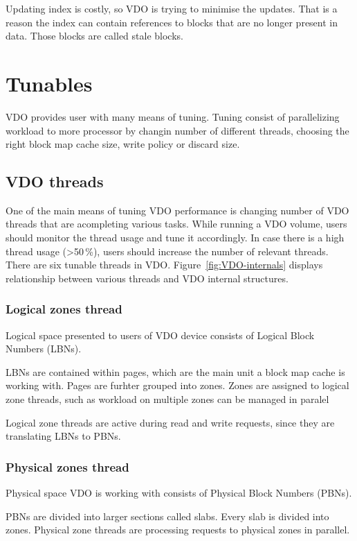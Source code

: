 \documentclass[
  color, %
  table, %
  lof,   %
  lot,   %
]{fithesis3}
\begin{document}
Updating index is costly, so VDO is trying to minimise the updates. That is a reason the index can contain references to blocks that are no longer present in data. Those blocks are called stale blocks.


\section{Tunables}
VDO provides user with many means of tuning. Tuning consist of parallelizing workload to more processor by changin number of different threads, choosing the right block map cache size, write policy or discard size.

\subsection{VDO threads}
One of the main means of tuning VDO performance is changing number of VDO threads that are acompleting various tasks. While running a VDO volume, users should monitor the thread usage and tune it accordingly. In case there is a high thread usage (>50\,\%), users should increase the number of relevant threads. There are six tunable threads in VDO. Figure~\ref{fig:VDO-internals} displays relationship between various threads and VDO internal structures.

\subsubsection{Logical zones thread}
Logical space presented to users of VDO device consists of Logical Block Numbers (LBNs).

LBNs are contained within pages, which are the main unit a block map cache is working with. Pages are furhter grouped into zones. Zones are assigned to logical zone threads, such as workload on multiple zones can be managed in paralel

Logical zone threads are active during read and write requests, since they are translating LBNs to PBNs.

\subsubsection{Physical zones thread}
Physical space VDO is working with consists of Physical Block Numbers (PBNs).

PBNs are divided into larger sections called slabs. Every slab is divided into zones. Physical zone threads are processing requests to physical zones in parallel.
\end{document}

